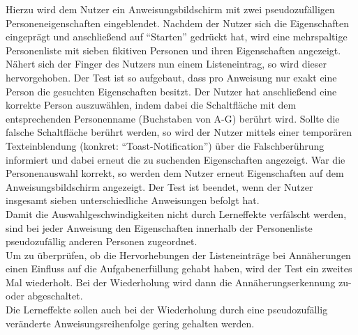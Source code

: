\documentclass[a4paper,12pt,bibliography=totoc]{scrreprt}%
\begin{document}
Hierzu wird dem Nutzer ein Anweisungsbildschirm mit zwei pseudozufälligen Personeneigenschaften eingeblendet. Nachdem der Nutzer sich die Eigenschaften eingeprägt und anschließend auf "`Starten"' gedrückt hat, wird eine mehrspaltige Personenliste mit sieben fikitiven Personen und ihren Eigenschaften angezeigt. Nähert sich der Finger des Nutzers nun einem Listeneintrag, so wird dieser hervorgehoben. Der Test ist so aufgebaut, dass pro Anweisung nur exakt eine Person die gesuchten Eigenschaften besitzt. Der Nutzer hat anschließend eine korrekte Person auszuwählen, indem dabei die Schaltfläche mit dem entsprechenden Personenname (Buchstaben von A-G) berührt wird. Sollte die falsche Schaltfläche berührt werden, so wird der Nutzer mittels einer temporären Texteinblendung (konkret: "`Toast-Notification"') über die Falschberührung informiert und dabei erneut die zu suchenden Eigenschaften angezeigt. War die Personenauswahl korrekt, so werden dem Nutzer erneut Eigenschaften auf dem Anweisungsbildschirm angezeigt. Der Test ist beendet, wenn der Nutzer insgesamt sieben unterschiedliche Anweisungen befolgt hat.\\
Damit die Auswahlgeschwindigkeiten nicht durch Lerneffekte verfälscht werden, sind bei jeder Anweisung den Eigenschaften innerhalb der Personenliste pseudozufällig anderen Personen zugeordnet.\\
Um zu überprüfen, ob die Hervorhebungen der Listeneinträge bei Annäherungen einen Einfluss auf die Aufgabenerfüllung gehabt haben, wird der Test ein zweites Mal wiederholt. Bei der Wiederholung wird dann die Annäherungserkennung zu- oder abgeschaltet.\\
Die Lerneffekte sollen auch bei der Wiederholung durch eine pseudozufällig veränderte Anweisungsreihenfolge gering gehalten werden.
\end{document}
